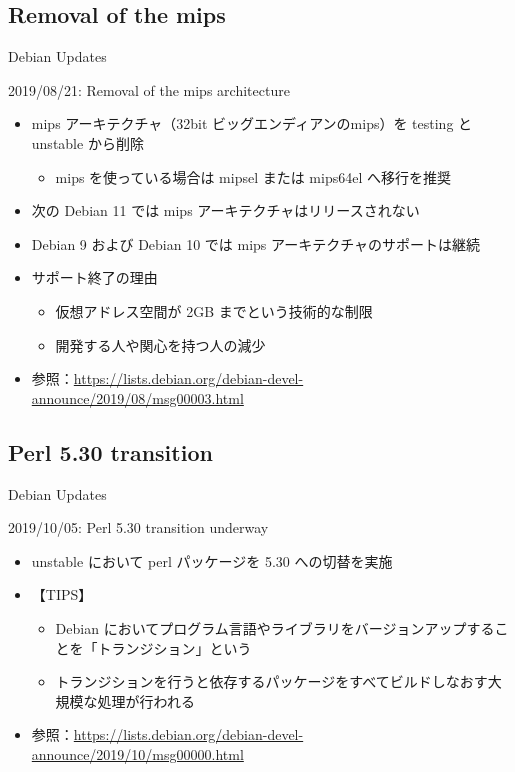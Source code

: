 \subsection{Removal of the mips}

\begin{frame}{Debian Updates}%

2019/08/21: Removal of the mips architecture
  
\begin{itemize}
\item mips アーキテクチャ（32bit ビッグエンディアンのmips）を testing と unstable から削除
  \begin{itemize}
  \item mips を使っている場合は mipsel または mips64el へ移行を推奨 
  \end{itemize}
\item 次の Debian 11 では mips アーキテクチャはリリースされない
\item Debian 9 および Debian 10 では mips アーキテクチャのサポートは継続
\item サポート終了の理由
  \begin{itemize}
  \item 仮想アドレス空間が 2GB までという技術的な制限
  \item 開発する人や関心を持つ人の減少
  \end{itemize}
\item 参照：\url{https://lists.debian.org/debian-devel-announce/2019/08/msg00003.html}
\end{itemize}

\end{frame}


\subsection{Perl 5.30 transition}

\begin{frame}{Debian Updates}%

2019/10/05: Perl 5.30 transition underway
  
\begin{itemize}
\item unstable において perl パッケージを 5.30 への切替を実施
\item 【TIPS】
  \begin{itemize}
  \item  Debian においてプログラム言語やライブラリをバージョンアップすることを「トランジション」という
  \item トランジションを行うと依存するパッケージをすべてビルドしなおす大規模な処理が行われる
  \end{itemize}
\item 参照：\url{https://lists.debian.org/debian-devel-announce/2019/10/msg00000.html}
\end{itemize}

\end{frame}


